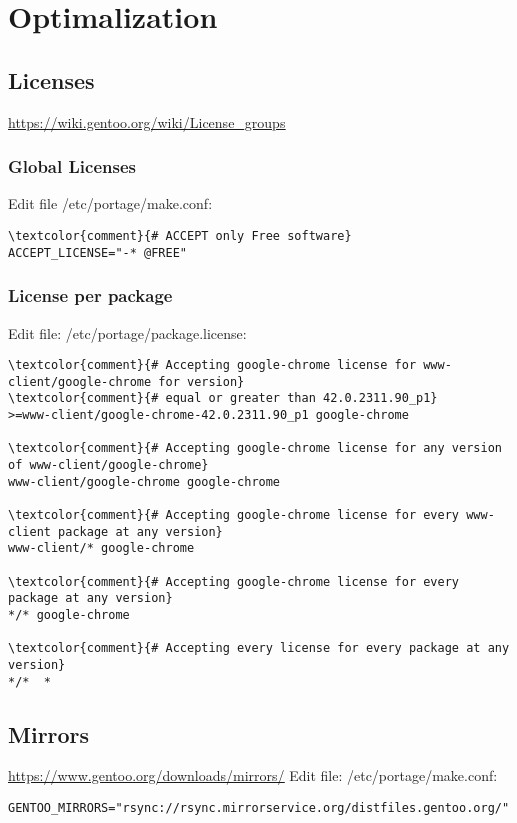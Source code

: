 \documentclass[10pt, a4paper, onecolumn, openany]{book}         %
\begin{document}
\chapter{Optimalization}%
\section{Licenses}
\underline{\url{https://wiki.gentoo.org/wiki/License_groups}}
\subsection{Global Licenses}
Edit file \textcolor{file}{/etc/portage/make.conf}:
\begin{Verbatim}[commandchars=\\\{\}]
\textcolor{comment}{# ACCEPT only Free software}
ACCEPT_LICENSE="-* @FREE"
\end{Verbatim}
\subsection{License per package}
Edit file: \textcolor{file}{/etc/portage/package.license}:
\begin{Verbatim}[commandchars=\\\{\}]
\textcolor{comment}{# Accepting google-chrome license for www-client/google-chrome for version}
\textcolor{comment}{# equal or greater than 42.0.2311.90_p1}
>=www-client/google-chrome-42.0.2311.90_p1 google-chrome

\textcolor{comment}{# Accepting google-chrome license for any version of www-client/google-chrome}
www-client/google-chrome google-chrome

\textcolor{comment}{# Accepting google-chrome license for every www-client package at any version}
www-client/* google-chrome

\textcolor{comment}{# Accepting google-chrome license for every package at any version}
*/* google-chrome

\textcolor{comment}{# Accepting every license for every package at any version}
*/*  *
\end{Verbatim}

\section{Mirrors}
\underline{\url{https://www.gentoo.org/downloads/mirrors/}}\newline
Edit file: \textcolor{file}{/etc/portage/make.conf}:
\begin{Verbatim}[commandchars=\\\{\}]
GENTOO_MIRRORS="rsync://rsync.mirrorservice.org/distfiles.gentoo.org/"
\end{Verbatim}
\end{document}
